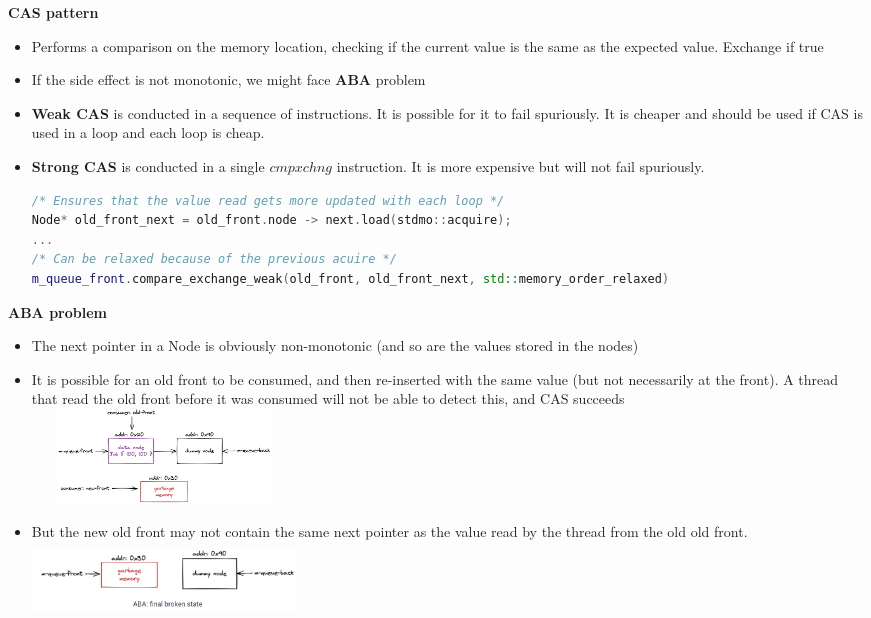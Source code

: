 \documentclass[10pt, landscape]{article}
\begin{document}
\begin{multicols}{4}
\textbf{CAS pattern} \\
\begin{itemize}
    \item Performs a comparison on the memory location, checking if the current value is the same as the expected value. Exchange if true
    \item If the side effect is not monotonic, we might face \textbf{ABA} problem
    \item \textbf{Weak CAS} is conducted in a sequence of instructions. It is possible for it to fail spuriously. It is cheaper and should be used if CAS is used in a loop and each loop is cheap.
    \item \textbf{Strong CAS} is conducted in a single $cmpxchng$ instruction. It is more expensive but will not fail spuriously.
    \begin{lstlisting}[language=C++, breaklines=true, breakatwhitespace=true]
/* Ensures that the value read gets more updated with each loop */
Node* old_front_next = old_front.node -> next.load(stdmo::acquire);
... 
/* Can be relaxed because of the previous acuire */
m_queue_front.compare_exchange_weak(old_front, old_front_next, std::memory_order_relaxed)
    \end{lstlisting}
\end{itemize}

\textbf{ABA problem} \\
\begin{itemize}
    \item The next pointer in a Node is obviously non-monotonic (and so are the values stored in the nodes)
    \item It is possible for an old front to be consumed, and then re-inserted with the same value (but not necessarily at the front). A thread that read the old front before it was consumed will not be able to detect this, and CAS succeeds \\
    \includegraphics*[width=7cm, height = 2.5cm]{aba1.png}

    \item But the new old front may not contain the same next pointer as the value read by the thread from the old old front.\\
    \includegraphics*[width=7cm, height =2cm]{aba2.png}
\end{itemize}


\end{multicols}
\end{document}

